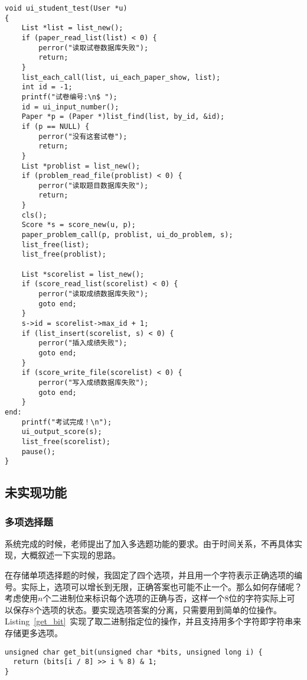 {\linespread{1}
\begin{lstlisting}[caption={\label{ui_student_test}ui\_student\_test()}]
void ui_student_test(User *u)
{
    List *list = list_new();
    if (paper_read_list(list) < 0) {
        perror("读取试卷数据库失败");
        return;
    }
    list_each_call(list, ui_each_paper_show, list);
    int id = -1;
    printf("试卷编号:\n$ ");
    id = ui_input_number();
    Paper *p = (Paper *)list_find(list, by_id, &id);
    if (p == NULL) {
        perror("没有这套试卷");
        return;
    }
    List *problist = list_new();
    if (problem_read_file(problist) < 0) {
        perror("读取题目数据库失败");
        return;
    }
    cls();
    Score *s = score_new(u, p);
    paper_problem_call(p, problist, ui_do_problem, s);
    list_free(list);
    list_free(problist);

    List *scorelist = list_new();
    if (score_read_list(scorelist) < 0) {
        perror("读取成绩数据库失败");
        goto end;
    }
    s->id = scorelist->max_id + 1;
    if (list_insert(scorelist, s) < 0) {
        perror("插入成绩失败");
        goto end;
    }
    if (score_write_file(scorelist) < 0) {
        perror("写入成绩数据库失败");
        goto end;
    }
end:
    printf("考试完成！\n");
    ui_output_score(s);
    list_free(scorelist);
    pause();
}
\end{lstlisting}
}

\subsection{未实现功能}

\subsubsection{多项选择题}

系统完成的时候，老师提出了加入多选题功能的要求。由于时间关系，不再具体实现，大概叙述一下实现的思路。

在存储单项选择题的时候，我固定了四个选项，并且用一个字符表示正确选项的编号。实际上，选项可以增长到无限，正确答案也可能不止一个。那么如何存储呢？考虑使用$n$个二进制位来标识每个选项的正确与否，这样一个8位的字符实际上可以保存8个选项的状态。要实现选项答案的分离，只需要用到简单的位操作。Listing~\ref{get_bit}~实现了取二进制指定位的操作，并且支持用多个字符即字符串来存储更多选项。

{\linespread{1}
\begin{lstlisting}[caption={\label{get_bit}get\_bit()}]
unsigned char get_bit(unsigned char *bits, unsigned long i) {
  return (bits[i / 8] >> i % 8) & 1;
}
\end{lstlisting}
}

